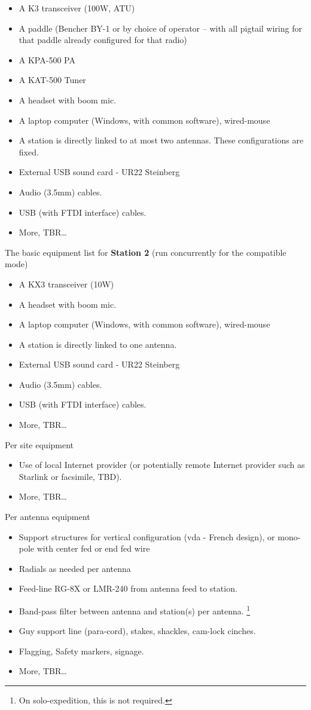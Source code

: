 \documentclass[11pt]{article}
\begin{document}
\begin{itemize}
\item A K3 transceiver (100W, ATU)
\item A paddle (Bencher BY-1 or by choice of operator -- with
all pigtail wiring for that paddle already configured for that radio)
\item A KPA-500 PA
\item A KAT-500 Tuner
\item A headset with boom mic.
\item A laptop computer (Windows, with common software), wired-mouse
\item A station is directly linked to at most two antennas. These
configurations are fixed.
\item External USB sound card - UR22 Steinberg
\item Audio (3.5mm) cables. 
\item USB (with FTDI interface) cables.
\item More, TBR\ldots
\end{itemize}

The basic equipment list for {\textbf{Station 2}} (run concurrently
for the compatible mode)
\begin{itemize}
\item A KX3 transceiver (10W)
\item A headset with boom mic.
\item A laptop computer (Windows, with common software), wired-mouse
\item A station is directly linked to one antenna.
\item External USB sound card - UR22 Steinberg
\item Audio (3.5mm) cables. 
\item USB (with FTDI interface) cables.
\item More, TBR\ldots
\end{itemize}

Per site equipment
\begin{itemize}
\item Use of local Internet provider (or potentially remote Internet
provider such as Starlink or facsimile, TBD).
\item More, TBR\ldots
\end{itemize}

Per antenna equipment
\begin{itemize}
\item Support structures for vertical configuration ({\gls{vda}} - French design),
or mono-pole with center fed or end fed wire
\item Radials as needed per antenna
\item Feed-line RG-8X or LMR-240 from antenna feed to station.
\item Band-pass filter between antenna and station(s) per antenna.
\footnote{On solo-expedition, this is not required.}
\item Guy support line (para-cord), stakes, shackles, cam-lock cinches.
\item Flagging, Safety markers, signage.
\item More, TBR\ldots
\end{itemize}
\end{document}
